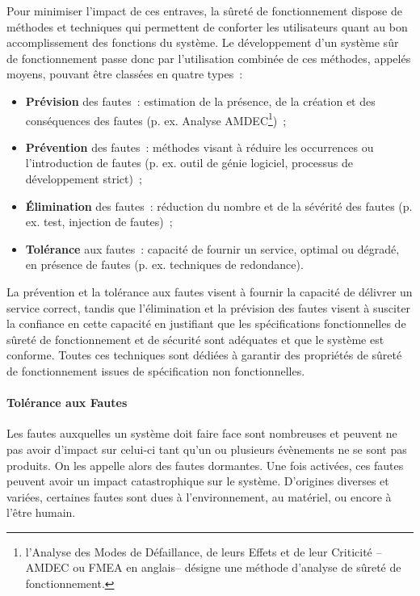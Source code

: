 \documentclass[french, a4paper, 11pt, twoside, pdftex]{StyleThese}
\begin{document}
		Pour minimiser l’impact de ces entraves, la sûreté de fonctionnement dispose de méthodes et techniques qui permettent de conforter les utilisateurs quant au bon accomplissement des fonctions du système. Le développement d’un système sûr de fonctionnement passe donc par l’utilisation combinée de ces méthodes, appelés moyens, pouvant être classées en quatre types~:
		\begin{itemize}
			\item \textbf{Prévision} des fautes~: estimation de la présence, de la création et des conséquences des fautes (p. ex. Analyse AMDEC\footnote{l'Analyse des Modes de Défaillance, de leurs Effets et de leur Criticité --AMDEC ou FMEA en anglais-- désigne une méthode d'analyse de sûreté de fonctionnement.})~;
			\item \textbf{Prévention} des fautes~: méthodes visant à réduire les occurrences ou l’introduction de fautes (p. ex. outil de génie logiciel, processus de développement strict)~;
			\item \textbf{Élimination} des fautes~: réduction du nombre et de la sévérité des fautes (p. ex. test, injection de fautes)~;
			\item \textbf{Tolérance} aux fautes~: capacité de fournir un service, optimal ou dégradé, en présence de fautes (p. ex. techniques de redondance).
		\end{itemize}
	
		La prévention et la tolérance aux fautes visent à fournir la capacité de délivrer un service correct, tandis que l’élimination et la prévision des fautes visent à susciter la confiance en cette capacité en justifiant que les spécifications fonctionnelles de sûreté de fonctionnement et de sécurité sont adéquates et que le système est conforme. Toutes ces techniques sont dédiées à garantir des propriétés de sûreté de fonctionnement issues de spécification non fonctionnelles. %
		
		\paragraph{Tolérance aux Fautes}
		Les fautes auxquelles un système doit faire face sont nombreuses et peuvent ne pas avoir d’impact sur celui-ci tant qu’un ou plusieurs évènements ne se sont pas produits. On les appelle alors des fautes dormantes. Une fois activées, ces fautes peuvent avoir un impact catastrophique sur le système. D’origines diverses et variées, certaines fautes sont dues à l’environnement, au matériel, ou encore à l’être humain.
		
\end{document}
